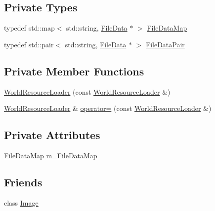 \subsection*{Private Types}
\begin{DoxyCompactItemize}
\item 
typedef std\+::map$<$ std\+::string, \mbox{\hyperlink{structnjli_1_1_world_resource_loader_1_1_file_data}{File\+Data}} $\ast$ $>$ \mbox{\hyperlink{classnjli_1_1_world_resource_loader_a5a3b461a48cb2119251464a5e117533d}{File\+Data\+Map}}
\item 
typedef std\+::pair$<$ std\+::string, \mbox{\hyperlink{structnjli_1_1_world_resource_loader_1_1_file_data}{File\+Data}} $\ast$ $>$ \mbox{\hyperlink{classnjli_1_1_world_resource_loader_a4c3e96bc649a040e1c74c71e5fab3b8b}{File\+Data\+Pair}}
\end{DoxyCompactItemize}
\subsection*{Private Member Functions}
\begin{DoxyCompactItemize}
\item 
\mbox{\hyperlink{classnjli_1_1_world_resource_loader_aca0a853c5159760d6d37cad0bbad7363}{World\+Resource\+Loader}} (const \mbox{\hyperlink{classnjli_1_1_world_resource_loader}{World\+Resource\+Loader}} \&)
\item 
\mbox{\hyperlink{classnjli_1_1_world_resource_loader}{World\+Resource\+Loader}} \& \mbox{\hyperlink{classnjli_1_1_world_resource_loader_a1c317a6c19a9bbd4e578a1bc70784d51}{operator=}} (const \mbox{\hyperlink{classnjli_1_1_world_resource_loader}{World\+Resource\+Loader}} \&)
\end{DoxyCompactItemize}
\subsection*{Private Attributes}
\begin{DoxyCompactItemize}
\item 
\mbox{\hyperlink{classnjli_1_1_world_resource_loader_a5a3b461a48cb2119251464a5e117533d}{File\+Data\+Map}} \mbox{\hyperlink{classnjli_1_1_world_resource_loader_a5ad02c4c153927307e320b0634b8e989}{m\+\_\+\+File\+Data\+Map}}
\end{DoxyCompactItemize}
\subsection*{Friends}
\begin{DoxyCompactItemize}
\item 
class \mbox{\hyperlink{classnjli_1_1_world_resource_loader_a5d6b29a75202aeeaef335faca9eb55e2}{Image}}
\end{DoxyCompactItemize}


